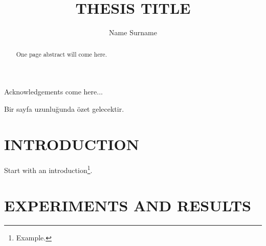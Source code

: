 \documentclass[a4paper,onesided,12pt]{report}
\title{THESIS TITLE}
\author{Name Surname}
\begin{document}
\makemstitle %
\makeapprovalpage
\begin{acknowledgements}
Acknowledgements come here...
\end{acknowledgements}
\begin{abstract}
One page abstract will come here.
\end{abstract}
\begin{ozet}
Bir sayfa uzunluğunda özet gelecektir.
\end{ozet}
\tableofcontents
\listoffigures
\listoftables
\begin{symbols}
%

\sym{}{}
\sym{ }{}

\end{symbols}

\begin{abbreviations}
\end{abbreviations}


\chapter{INTRODUCTION}
\label{chapter:introduction}
Start with an introduction\footnote{Example.}.

\lipsum[1]

\lipsum[2]

\lipsum[3]

\lipsum[4]

\lipsum[5]

\lipsum[6]

\lipsum[7]

\lipsum[8]

%
\chapter{EXPERIMENTS AND RESULTS}
\label{chapter:experiments-and-results}
\end{document}
